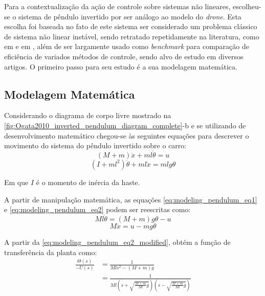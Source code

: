 Para a contextualização da ação de controle sobre sistemas não lineares, escolheu-se o sistema de pêndulo invertido por ser análogo ao modelo do \textit{drone}. Esta escolha foi baseada no fato de este sistema ser considerado um problema clássico de sistema não linear instável, sendo retratado repetidamente na literatura, como em \cite[p.~68]{Ogata2010} e em \cite[p.~186]{Dorf2011}, além de ser largamente usado como \textit{benchmark} para comparação de eficiência de variados métodos de controle, sendo alvo de estudo em diversos artigos. O primeiro passo para seu estudo é a sua modelagem matemática.

\subsection{Modelagem Matemática}
\label{subsec:sistemas-pendulum-mathematical-model}

Considerando o diagrama de corpo livre mostrado na \autoref{fig:Ogata2010_inverted_pendulum_diagram_complete}-b e se utilizando de desenvolvimento matemático chegou-se às seguintes equações para descrever o movimento do sistema do pêndulo invertido sobre o carro:
\begin{equation} \label{eq:modeling_pendulum_eq1}
	(M+m)\ddot{x} + ml\ddot{\theta} = u
\end{equation}
\begin{equation} \label{eq:modeling_pendulum_eq2}
	(I+ml^2)\ddot{\theta} + ml\ddot{x} = mlg\theta
\end{equation}
 
Em que $I$ é o momento de inércia da haste.

A partir de manipulação matemática, as equações \ref{eq:modeling_pendulum_eq1} e \ref{eq:modeling_pendulum_eq2} podem ser reescritas como:
\begin{equation} \label{eq:modeling_pendulum_eq1_modified}
	Ml\ddot{\theta} = (M+m)g\theta - u
\end{equation}
\begin{equation} \label{eq:modeling_pendulum_eq2_modified}
	M\ddot{x} = u - mg\theta
\end{equation}

A partir da \autoref{eq:modeling_pendulum_eq2_modified},  obtém a função de transferência da planta como:
\begin{align} \label{eq:modeling_pendulum_tf}
\frac{\Theta(s)}{-U(s)} &= \frac{1}{Mls^2-(M+m)g} \nonumber \\
						&= \frac{1}{Ml(s+\sqrt{\frac{M+m}{Ml}g})(s-\sqrt{\frac{M+m}{Ml}g})}
\end{align}

